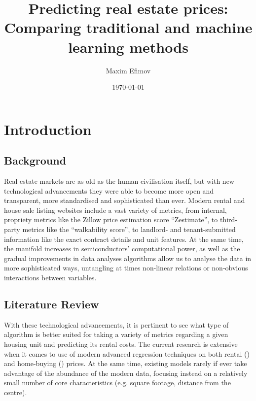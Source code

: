 \documentclass[12pt]{report}
\title{Predicting real estate prices: Comparing traditional and machine learning methods}
\author{Maxim Efimov}
\date{\today}
\begin{document}
\maketitle
\tableofcontents
\newpage
{} %
\fontsize{12}{18}\selectfont %
\renewcommand{\footnotesize}{\fontsize{10}{12}\selectfont} %


\newpage

\section{Introduction}
\subsection{Background}

Real estate markets are as old as the human civilisation itself, but with new technological advancements they were able to become more open and transparent, more standardised and sophisticated than ever. Modern rental and house sale listing websites include a vast variety of metrics, from internal, propriety metrics like the Zillow price estimation score “Zestimate”, to third-party metrics like the “walkability score”, to landlord- and tenant-submitted information like the exact contract details and unit features. At the same time, the manifold increases in semiconductors’ computational power, as well as the gradual improvements in data analyses algorithms allow us to analyse the data in more sophisticated ways, untangling at times non-linear relations or non-obvious interactions between variables.
\subsection{Literature Review}

With these technological advancements, it is pertinent to see what type of algorithm is better suited for taking a variety of metrics regarding a given housing unit and predicting its rental costs. The current research is extensive when it comes to use of modern advanced regression techniques on both rental (\cite{neloy2019}) and home-buying (\cite{Shahhosseini2001}) prices. At the same time, existing models rarely if ever take advantage of the abundance of the modern data, focusing instead on a relatively small number of core characteristics (e.g. square footage, distance from the centre).
\end{document}
